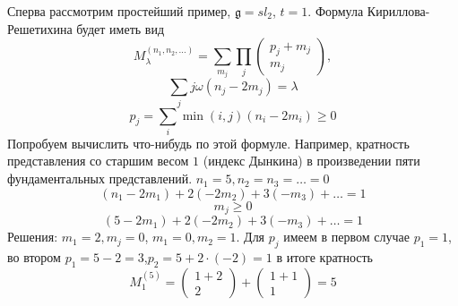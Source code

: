 \documentclass[12pt]{iopart}
\newcommand{\gf}{\mathfrak{g}}
\begin{document}
Сперва рассмотрим простейший пример, $\gf=sl_{2}$, $t=1$. Формула Кириллова-Решетихина будет иметь вид
\begin{equation}
  \label{eq:1}
  M_{\lambda}^{(n_{1},n_{2},\dots)}=\sum_{m_{j}}\prod_{j}\left(
    \begin{array}{c}
      p_{j}+m_{j}\\
      m_{j}
    \end{array}\right),
\end{equation}
\begin{equation}
  \label{eq:2}
  \sum_{j}j\omega (n_{j}-2m_{j})=\lambda
\end{equation}
\begin{equation}
  \label{eq:4}
  p_{j}=\sum_{i}\min(i,j)(n_{i}-2m_{i})\geq 0
\end{equation}
Попробуем вычислить что-нибудь по этой формуле. Например, кратность представления со старшим весом
$1$ (индекс Дынкина) в произведении пяти фундаментальных представлений. $n_{1}=5, n_{2}=n_{3}=\dots=0$
\begin{equation}
  \label{eq:5}
  (n_{1}-2m_{1})+2(-2m_{2})+3(-m_{3})+\dots=1
\end{equation}
\begin{equation}
  \label{eq:9}
  m_{j}\geq 0
\end{equation}
\begin{equation}
  \label{eq:8}
    (5-2m_{1})+2(-2m_{2})+3(-m_{3})+\dots=1
\end{equation}
Решения: $m_{1}=2, m_{j}=0$, $m_{1}=0, m_{2}=1$. 
Для $p_{j}$ имеем в первом случае $p_{1}=1$, во втором $p_{1}=5-2=3$,$p_{2}= 5+2\cdot (-2)=1$ в итоге кратность
\begin{equation}
  \label{eq:10}
   M_{1}^{(5)}=\left(
    \begin{array}{c}
      1+2\\
      2
    \end{array}\right)+
\left(\begin{array}{c}
      1+1\\
      1
    \end{array}\right)=5
\end{equation}
\end{document}
